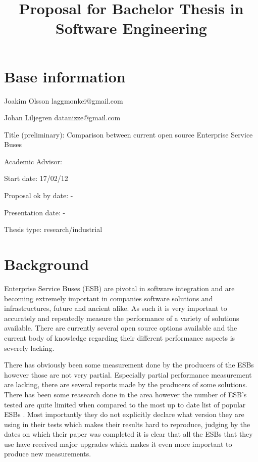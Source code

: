 \documentclass[10pt,a4paper]{proposal}
\title{Proposal for Bachelor Thesis in Software Engineering}
\begin{document}
\maketitle
\thispagestyle{fancy}


\section*{Base information}

Joakim Olsson laggmonkei@gmail.com

Johan Liljegren datanizze@gmail.com

Title (preliminary): Comparison between current open source Enterprise Service Buses

Academic Advisor:  

Start date: 17/02/12

Proposal ok by date: -

Presentation date: -


Thesis type: research\slash industrial


\section*{Background}


Enterprise Service Buses (ESB) \cite{falko07} are pivotal in software integration and are becoming extremely important in companies software solutions and  infrastructures, future and ancient alike. \cite{fenner03}
As such it is very important to accurately and repeatedly measure the performance of a variety of solutions available. 
There are currently several open source options available \cite{mehta11} and the current body of knowledge regarding their different performance aspects is severely lacking. 


There has obviously been some measurement done by the producers of the ESBs however those are not very partial.
 Especially partial performance measurement are lacking, there are several reports made by the producers of some solutions. \cite{Perera07,mulevsjboss,mulevsglassfish,mulevsservicemix,mulesoft08} 
There has been some reasearch done in the area \cite{ESBthesis} however the number of ESB's tested are quite limited when compared to the most up to date list of popular ESBs \cite{mehta11}. 
Most importantly they do not explicitly declare what version they are using in their tests which makes their results hard to reproduce, judging by the dates on which their paper
 was completed it is clear that all the ESBs that they use have received major upgrades which makes it even more important to produce new measurements.
\end{document}
